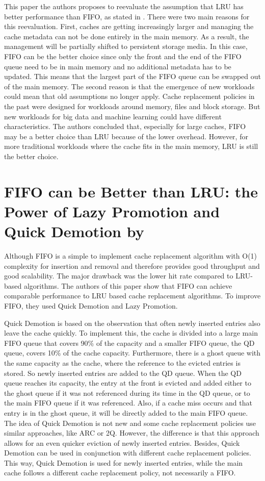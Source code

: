 \documentclass[
	12pt,
	a4paper,
	abstract,
	bibliography=totoc,
	chapterprefix,
	headings=openright,
	numbers=endperiod,
	parskip=half,
	twoside,
]{scrreprt}
\begin{document}
This paper the authors proposes to reevaluate the assumption that LRU 
has better performance than FIFO, as stated in \cite{van1992lru}.
There were two main reasons for this reevaluation.
First, caches are getting increasingly larger and managing the cache metadata can not be done entirely in the main memory.
As a result, the management will be partially shifted to persistent storage media.
In this case, FIFO can be the better choice since only the front and the end of the FIFO queue need to be in main memory
and no additional metadata has to be updated.
This means that the largest part of the FIFO queue can be swapped out of the main memory.
The second reason is that the emergence of new workloads could mean that old assumptions no longer apply. 
Cache replacement policies in the past were designed for workloads around memory, files and block storage. 
But new workloads for big data and machine learning could have different characteristics.
The authors concluded that, especially for large caches, FIFO may be a better choice than LRU because of the lower overhead. 
However, for more traditional workloads where the cache fits in the main memory, LRU is still the better choice.

\section*{FIFO can be Better than LRU: the Power of Lazy Promotion and Quick Demotion by \cite{yang2023fifo}}

Although FIFO is a simple to implement cache replacement algorithm with O(1) complexity for insertion and removal 
and therefore provides good throughput and good scalability.
The major drawback was the lower hit rate compared to LRU-based algorithms.
The authors of this paper \cite{yang2023fifo} show that FIFO can achieve comparable 
performance to LRU based cache replacement algorithms.
To improve FIFO, they used Quick Demotion and Lazy Promotion.

Quick Demotion is based on the observation that often newly inserted entries also leave the cache quickly.
To implement this, the cache is divided into a large main FIFO queue that covers 90\% of the capacity and a 
smaller FIFO queue, the QD queue, covers 10\% of the cache capacity.
Furthermore, there is a ghost queue with the same capacity as the cache, 
where the reference to the evicted entries is stored.
So newly inserted entries are added to the QD queue. When the QD queue reaches its capacity, 
the entry at the front is evicted and added either to 
the ghost queue if it was not referenced during its time in the QD queue, or to the main FIFO queue if it was referenced.
Also, if a cache miss occurs and that entry is in the ghost queue, it will be directly added to the main FIFO queue.
The idea of Quick Demotion is not new and some cache replacement policies use similar approaches, like ARC or 2Q.
However, the difference is that this approach allows for an even quicker eviction of newly inserted entries.
Besides, Quick Demotion can be used in conjunction with different cache replacement policies.
This way, Quick Demotion is used for newly inserted entries, while the main cache follows a different cache replacement policy, 
not necessarily a FIFO.
\end{document}
